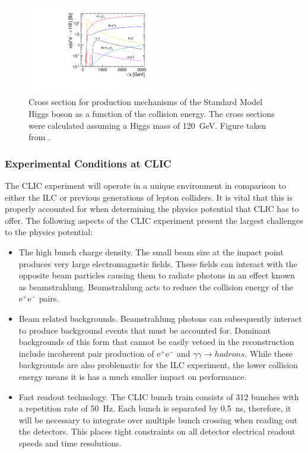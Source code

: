\begin{figure}[h!]
\includegraphics[width=0.5\textwidth]{Introduction/Plots/CDRPlots/HiggsCrossSectionCLIC.pdf}
\caption[Cross section for production mechanisms of the Standard Model Higgs boson as a function of the collision energy.  The cross sections were calculated assuming a Higgs mass of 120~GeV.  Figure taken from \cite{Linssen:2012hp}.]{Cross section for production mechanisms of the Standard Model Higgs boson as a function of the collision energy.  The cross sections were calculated assuming a Higgs mass of 120~GeV.  Figure taken from \cite{Linssen:2012hp}.}
\label{fig:higssprodclic}
\end{figure}


\subsubsection{Experimental Conditions at CLIC}
The CLIC experiment will operate in a unique environment in comparison to either the ILC or previous generations of lepton colliders.  It is vital that this is properly accounted for when determining the physics potential that CLIC has to offer.  The following aspects of the CLIC experiment present the largest challenges to the physics potential:

\begin{itemize}
\item The high bunch charge density.  The small beam size at the impact point produces very large electromagnetic fields.  These fields can interact with the opposite beam particles causing them to radiate photons in an effect known as beamstrahlung.  Beamstrahlung acts to reduce the collision energy of the $\text{e}^{+}\text{e}^{-}$ pairs.   
\item Beam related backgrounds.  Beamstrahlung photons can subsequently interact to produce background events that must be accounted for.  Dominant backgrounds of this form that cannot be easily vetoed in the reconstruction include incoherent pair production of $\text{e}^{+}\text{e}^{-}$ and $\gamma\gamma \rightarrow hadrons$.  While these backgrounds are also problematic for the ILC experiment, the lower collision energy means it is has a much smaller impact on performance.
\item Fast readout technology.  The CLIC bunch train consists of 312 bunches with a repetition rate of 50~Hz.  Each bunch is separated by 0.5~ns, therefore, it will be necessary to integrate over multiple bunch crossing when reading out the detectors.  This places tight constraints on all detector electrical readout speeds and time resolutions.   
\end{itemize}

